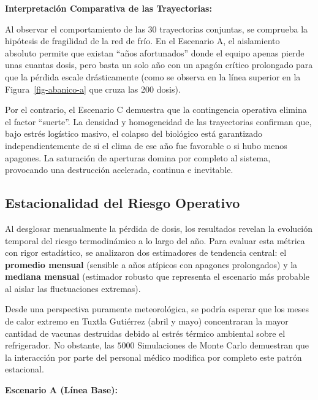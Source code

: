 \documentclass[
  spanish,
  us-letterpaper,
]{scrreprt}
\numberwithin{equation}{section}
\theoremstyle{plain}
\theoremstyle{plain}
\theoremstyle{definition}
\theoremstyle{plain}
\theoremstyle{remark}
\begin{document}
\textbf{Interpretación Comparativa de las Trayectorias:}

Al observar el comportamiento de las 30 trayectorias conjuntas, se
comprueba la hipótesis de fragilidad de la red de frío. En el Escenario
A, el aislamiento absoluto permite que existan ``años afortunados''
donde el equipo apenas pierde unas cuantas dosis, pero basta un solo año
con un apagón crítico prolongado para que la pérdida escale
drásticamente (como se observa en la línea superior en la
Figura~\ref{fig-abanico-a} que cruza las 200 dosis).

Por el contrario, el Escenario C demuestra que la contingencia operativa
elimina el factor ``suerte''. La densidad y homogeneidad de las
trayectorias confirman que, bajo estrés logístico masivo, el colapso del
biológico está garantizado independientemente de si el clima de ese año
fue favorable o si hubo menos apagones. La saturación de aperturas
domina por completo al sistema, provocando una destrucción acelerada,
continua e inevitable.

\subsection{Estacionalidad del Riesgo
Operativo}\label{estacionalidad-del-riesgo-operativo}

Al desglosar mensualmente la pérdida de dosis, los resultados revelan la
evolución temporal del riesgo termodinámico a lo largo del año. Para
evaluar esta métrica con rigor estadístico, se analizaron dos
estimadores de tendencia central: el \textbf{promedio mensual} (sensible
a años atípicos con apagones prolongados) y la \textbf{mediana mensual}
(estimador robusto que representa el escenario más probable al aislar
las fluctuaciones extremas).

Desde una perspectiva puramente meteorológica, se podría esperar que los
meses de calor extremo en Tuxtla Gutiérrez (abril y mayo) concentraran
la mayor cantidad de vacunas destruidas debido al estrés térmico
ambiental sobre el refrigerador. No obstante, las \(5000\) Simulaciones
de Monte Carlo demuestran que la interacción por parte del personal
médico modifica por completo este patrón estacional.

\textbf{Escenario A (Línea Base):}
\end{document}
